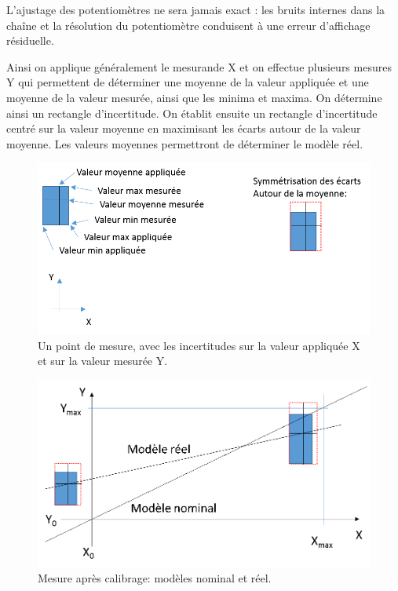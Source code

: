 L'ajustage des potentiomètres ne sera jamais exact : les bruits internes dans la chaîne et  la résolution du potentiomètre conduisent à une erreur d'affichage résiduelle.

Ainsi on applique généralement le mesurande X et on effectue plusieurs mesures Y qui permettent de déterminer une moyenne de la valeur appliquée et une moyenne de la valeur mesurée, ainsi que les minima et maxima. On détermine ainsi un rectangle d'incertitude. On établit ensuite un rectangle d'incertitude centré sur la valeur moyenne en maximisant les écarts autour de la valeur moyenne. Les valeurs moyennes permettront de déterminer le modèle réel.

\begin{figure}
    \centering
    \includegraphics[width=12cm]{assets/figures/3_3_explications.PNG}
    \caption{Un point de mesure, avec les incertitudes sur la valeur appliquée X et sur la valeur mesurée Y.}
    \label{fig:3_3_explications}
\end{figure}

\begin{figure}
    \centering
    \includegraphics[width=12cm]{assets/figures/3_3a_reel_versus_nominal.PNG}
    \caption{Mesure après calibrage: modèles nominal et réel.}
    \label{fig:3_3a_reel_versus_nominal}
\end{figure}

